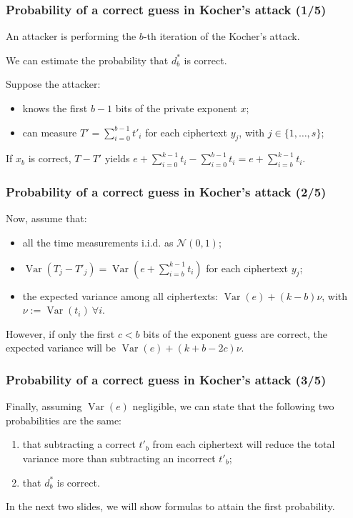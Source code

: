 \documentclass{beamer}
\DeclareMathOperator{\Var}{Var}
\begin{document}
\begin{frame}
\frametitle{Probability of a correct guess in Kocher's attack (1/5)}

An attacker is performing the $b$-th iteration of the Kocher's attack.

We can estimate the probability that $d^*_b$ is correct.

Suppose the attacker:
\begin{itemize}
  \item knows the first $b - 1$ bits of the private exponent $x$;
  \item can measure $T' = \sum_{i = 0}^{b - 1} t'_i$ for each ciphertext $y_j$, with $j \in \{ 1, \dots, s \}$;
\end{itemize}
If $x_b$ is correct, $T - T'$ yields $e + \sum_{i = 0}^{k - 1} t_i - \sum_{i = 0}^{b - 1} t_i = e + \sum_{i = b}^{k - 1} t_i$.

\end{frame}
\begin{frame}
\frametitle{Probability of a correct guess in Kocher's attack (2/5)}

Now, assume that:
\begin{itemize}
  \item all the time measurements i.i.d. as $\mathcal{N}(0, 1)$;
  \item $\Var(T_j - T'_j) = \Var(e + \sum_{i = b}^{k - 1} t_i)$ for each ciphertext $y_j$;
  \item the expected variance among all ciphertexts: $\Var(e) + (k - b)\nu$, with $\nu := \Var(t_i)\ \forall i$.
\end{itemize}
However, if only the first $c < b$ bits of the exponent guess are correct, the expected variance will be $\Var(e) + (k + b - 2c)\nu$.

\end{frame}
\begin{frame}
\frametitle{Probability of a correct guess in Kocher's attack (3/5)}

Finally, assuming $\Var(e)$ negligible, we can state that the following two probabilities are the same:

\begin{enumerate}
  \item that subtracting a correct $t'_b$ from each ciphertext will reduce the total variance more than subtracting an incorrect $t'_b$;
  \item that $d^*_b$ is correct.
\end{enumerate}

In the next two slides, we will show formulas to attain the first probability.
\end{frame}
\end{document}
